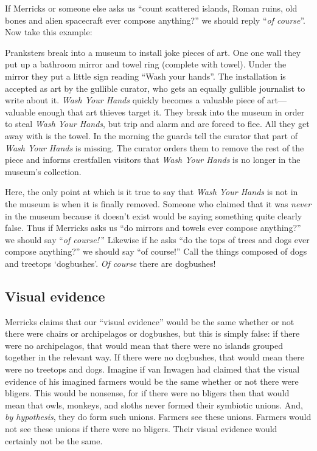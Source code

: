 \documentclass[11pt]{article}
\newenvironment{squote}{%
\begin{spacing}{1}
       	\begin{list}{}{%
\setlength{\labelwidth}{0pt}%
\rightmargin\leftmargin%
}
\item\relax
}{%
\end{list}%
\end{spacing}
}
\begin{document}
\begin{spacing}{1.25}
If Merricks or someone else asks us ``count scattered islands, Roman
ruins, old bones and alien spacecraft ever compose anything?'' we
should reply ``{\em of course}''.  Now take this example:

\begin{squote}
Pranksters break into a museum to install joke pieces of art.  One one
wall they put up a bathroom mirror and towel ring (complete with
towel).  Under the mirror they put a little sign reading ``Wash your
hands''.  The installation is accepted as art by the gullible curator,
who gets an equally gullible journalist to write about it.  {\em Wash
  Your Hands} quickly becomes a valuable piece of art---valuable
enough that art thieves target it.  They break into the museum in
order to steal {\em Wash Your Hands}, but trip and alarm and are
forced to flee.  All they get away with is the towel.  In the morning
the guards tell the curator that part of {\em Wash Your Hands} is
missing.  The curator orders them to remove the rest of the piece and
informs crestfallen visitors that {\em Wash Your Hands} is no longer
in the museum's collection.
\end{squote}

Here, the only point at which is it true to say that {\em Wash Your
  Hands} is not in the museum is when it is finally removed.  Someone
who claimed that it was {\em never} in the museum because it doesn't
exist would be saying something quite clearly false.  Thus if Merricks
asks us ``do mirrors and towels ever compose anything?'' we should say
``{\em of course!}\,''  Likewise if he asks ``do the tops of trees and
dogs ever compose anything?'' we should say ``of course!''  Call the
things composed of dogs and treetops `dogbushes'.  {\em Of course}
there are dogbushes!


\subsection{Visual evidence}
\label{visual}
Merricks claims that our ``visual evidence'' would be the same whether
or not there were chairs or archipelagos or dogbushes, but this is
simply false: if there were no archipelagos, that would mean that
there were no islands grouped together in the relevant way.  If there
were no dogbushes, that would mean there were no treetops and dogs.
Imagine if van Inwagen had claimed that the visual evidence of his
imagined farmers would be the same whether or not there were bligers.
This would be nonsense, for if there were no bligers then that would
mean that owls, monkeys, and sloths never formed their symbiotic
unions.  And, {\em by hypothesis}, they do form such unions.  Farmers
see these unions.  Farmers would not see these unions if there were no
bligers.  Their visual evidence would certainly not be the same.


\end{spacing}
\end{document}
